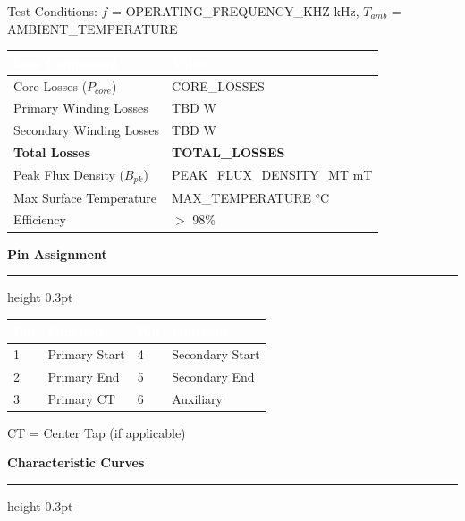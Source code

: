 \documentclass[10pt,a4paper]{article}
\newcommand{\sectiontitle}[1]{%
    \vspace{3mm}%
    {\large\bfseries\color{primary}#1}%
    \vspace{1mm}%
    \hrule height 0.3pt%
    \vspace{2mm}%
}
\begin{document}
\begin{minipage}[t]{0.48\textwidth}
{\footnotesize
Test Conditions: $f$ = {{OPERATING_FREQUENCY_KHZ}} kHz, $T_{amb}$ = {{AMBIENT_TEMPERATURE}}

\vspace{2mm}
\begin{tabular}{|L{35mm}|L{25mm}|}
\hline
{}
\textcolor{white}{\textbf{Loss Component}} & \textcolor{white}{\textbf{Value}} \\
\hline
Core Losses ($P_{core}$) & {{CORE_LOSSES}} \\
Primary Winding Losses & TBD W \\
Secondary Winding Losses & TBD W \\
\textbf{Total Losses} & \textbf{{{TOTAL_LOSSES}}} \\
\hline
Peak Flux Density ($B_{pk}$) & {{PEAK_FLUX_DENSITY_MT}} mT \\
Max Surface Temperature & {{MAX_TEMPERATURE}} °C \\
Efficiency & $>$ 98\% \\
\hline
\end{tabular}
}
\end{minipage}
\hfill
\begin{minipage}[t]{0.48\textwidth}
\sectiontitle{Pin Assignment}
{\footnotesize
\begin{tabular}{|C{12mm}|L{25mm}|C{12mm}|L{25mm}|}
\hline
{}
\textcolor{white}{\textbf{Pin}} & \textcolor{white}{\textbf{Function}} & 
\textcolor{white}{\textbf{Pin}} & \textcolor{white}{\textbf{Function}} \\
 & Primary Start & 4 & Secondary Start \\
2 & Primary End & 5 & Secondary End \\
3 & Primary CT & 6 & Auxiliary \\
\hline
\end{tabular}
}

\vspace{2mm}
{\footnotesize\color{textmuted} CT = Center Tap (if applicable)}
\end{minipage}

\vspace{4mm}

\sectiontitle{Characteristic Curves}
\end{document}
